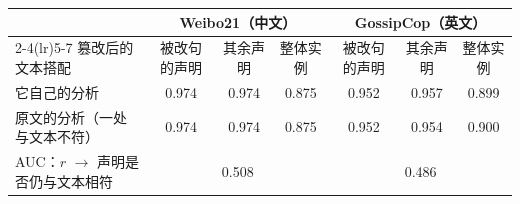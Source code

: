 \begin{tabular}{lcccccc}
\toprule
 & \multicolumn{3}{c}{Weibo21（中文）} & \multicolumn{3}{c}{GossipCop（英文）} \\
\cmidrule(lr){2-4}\cmidrule(lr){5-7}
篡改后的文本搭配 & 被改句的声明 & 其余声明 & 整体实例 & 被改句的声明 & 其余声明 & 整体实例 \\
\midrule
它自己的分析 & 0.974 & 0.974 & 0.875 & 0.952 & 0.957 & 0.899 \\
原文的分析（一处与文本不符） & 0.974 & 0.974 & 0.875 & 0.952 & 0.954 & 0.900 \\
\midrule
AUC：$r$ $\rightarrow$ 声明是否仍与文本相符 & \multicolumn{3}{c}{0.508} & \multicolumn{3}{c}{0.486} \\
\bottomrule
\end{tabular}
